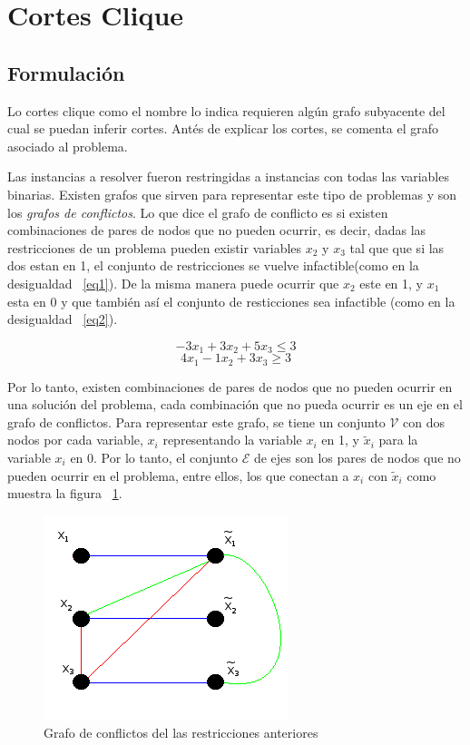 \section{Cortes Clique}

\bigskip
\subsection{Formulaci\'on}
\label{formulacion}

Lo cortes clique como el nombre lo indica requieren alg\'un grafo subyacente del cual se puedan inferir cortes.
Ant\'es de explicar los cortes, se comenta el grafo asociado al problema.

Las instancias a resolver fueron restringidas a instancias con todas las variables binarias.
Existen grafos que sirven para representar este tipo de problemas y son los \emph{grafos de conflictos}.
Lo que dice el grafo de conflicto es si existen combinaciones de pares de nodos que no pueden ocurrir, es decir,
dadas las restricciones de un problema pueden existir variables $x_2$ y $x_3$ tal que que si las dos estan en 1,
el conjunto de restricciones se vuelve infactible(como en la desigualdad ~\ref{eq1}). De la misma manera puede ocurrir que $x_2$ este en 1, y $x_1$ esta en 0 y que tambi\'en
as\'i el conjunto de resticciones sea infactible (como en la desigualdad ~\ref{eq2}).

\begin{equation} \label{eq1}
-3 x_1 + 3 x_2 + 5 x_3 \leq 3
\end{equation}
\begin{equation} \label{eq2}
4 x_1 - 1 x_2 + 3 x_3 \geq 3
\end{equation}

Por lo tanto, existen combinaciones de pares de nodos que no pueden ocurrir en una soluci\'on del problema, cada combinaci\'on que no pueda ocurrir
es un eje en el grafo de conflictos. Para representar este grafo, se tiene un conjunto $\mathcal{V}$ con dos nodos por cada variable, $x_i$
representando la variable $x_i$ en 1, y $\tilde{x}_i$ para la variable $x_i$ en 0. Por lo tanto, el conjunto $\mathcal{E}$ de ejes son los pares de 
nodos que no pueden ocurrir en el problema, entre ellos, los que conectan a $x_i$ con $\tilde{x}_i$ como muestra la figura ~\ref{fig1}.


\begin{figure}[H]
\begin{center}
\includegraphics{grafoconflicto}
\end{center}
\caption{Grafo de conflictos del las restricciones anteriores}
\label{fig1}
\end{figure}

